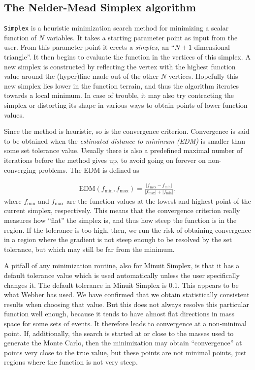 \documentclass[twoside,english]{uiofysmaster}
\begin{document}
\subsection{The Nelder-Mead Simplex algorithm}

{\tt Simplex} \cite{nelder1965simplex} is a heuristic minimization search method for minimizing a scalar function of $N$ variables. It takes a starting parameter point as input from the user. From this parameter point it erects a {\it simplex}, an ``$N+1$-dimensional triangle''. It then begins to evaluate the function in the vertices of this simplex. A new simplex is constructed by reflecting the vertex with the highest function value around the (hyper)line made out of the other $N$ vertices. Hopefully this new simplex lies lower in the function terrain, and thus the algorithm iterates towards a local minimum. In case of trouble, it may also try contracting the simplex or distorting its shape in various ways to obtain points of lower function values. 

Since the method is heuristic, so is the convergence criterion. Convergence is said to be obtained when the {\it estimated distance to minimum (EDM)} is smaller than some set tolerance value. Usually there is also a predefined maximal number of iterations before the method gives up, to avoid going on forever on non-converging problems. The EDM is defined as

\begin{align}
	\mathrm{EDM}(f_\mathrm{min},f_\mathrm{max}) = \frac{|f_\mathrm{max}-f_\mathrm{min}|}{|f_\mathrm{max}| + |f_\mathrm{min}|},
\end{align}
where $f_\mathrm{min}$ and $f_\mathrm{max}$ are the function values at the lowest and highest point of the current simplex, respectively. This means that the convergence criterion really measures how ``flat'' the simplex is, and thus how steep the function is in the region. If the tolerance is too high, then, we run the risk of obtaining convergence in a region where the gradient is not steep enough to be resolved by the set tolerance, but which may still be far from the minimum.

A pitfall of any minimization routine, also for Minuit Simplex, is that it has a default tolerance value which is used automatically unless the user specifically changes it. The default tolerance in Minuit Simplex is 0.1. This appears to be what Webber has used. We have confirmed that we obtain statistically consistent results when choosing that value. But this does not always resolve this particular function well enough, because it tends to have almost flat directions in mass space for some sets of events. It therefore leads to convergence at a non-minimal point. If, additionally, the search is started at or close to the masses used to generate the Monte Carlo, then the minimization may obtain ``convergence'' at points very close to the true value, but these points are not minimal points, just regions where the function is not very steep.
\end{document}
